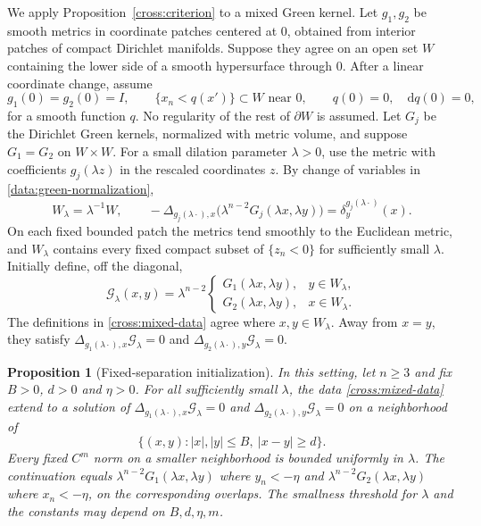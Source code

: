 \documentclass[11pt,a4paper]{article}
\newtheorem{proposition}[theorem]{Proposition}
\theoremstyle{definition}
\theoremstyle{remark}
\newcommand{\dd}{\mathrm d}
\numberwithin{equation}{section}
\begin{document}
We apply Proposition~\ref{cross:criterion} to a mixed Green kernel.
Let $g_1,g_2$ be smooth
metrics in coordinate patches centered at $0$, obtained from interior
patches of compact Dirichlet manifolds.  Suppose they agree on an open
set $W$ containing the lower side of a smooth hypersurface through $0$.
After a linear coordinate change, assume
\[
 g_1(0)=g_2(0)=I,\qquad
 \{x_n<q(x')\}\subset W\text{ near }0,\qquad
 q(0)=0,\quad \dd q(0)=0,
\]
for a smooth function $q$.  No regularity of the rest of $\partial W$
is assumed.
Let $G_j$ be the Dirichlet Green kernels, normalized with metric volume,
and suppose $G_1=G_2$ on $W\times W$.
For a small dilation parameter $\lambda>0$, use the metric with
coefficients $g_j(\lambda z)$ in the rescaled coordinates $z$.
By change of variables in \eqref{data:green-normalization},
\begin{equation}\label{cross:dilation}
 W_\lambda=\lambda^{-1}W,\qquad
 -\Delta_{g_j(\lambda\cdot),x}
    \bigl(\lambda^{n-2}G_j(\lambda x,\lambda y)\bigr)
     =\delta_y^{g_j(\lambda\cdot)}(x).
\end{equation}
On each fixed bounded patch the metrics tend smoothly to the Euclidean
metric, and $W_\lambda$ contains every fixed compact subset of
$\{z_n<0\}$ for sufficiently small $\lambda$.
Initially define, off the diagonal,
\begin{equation}\label{cross:mixed-data}
 \mathcal G_\lambda(x,y)=\lambda^{n-2}
 \begin{cases}
 G_1(\lambda x,\lambda y),&y\in W_\lambda,\\
 G_2(\lambda x,\lambda y),&x\in W_\lambda.
 \end{cases}
\end{equation}
The definitions in \eqref{cross:mixed-data} agree where
$x,y\in W_\lambda$.  Away from $x=y$, they satisfy
$\Delta_{g_1(\lambda\cdot),x}\mathcal G_\lambda=0$ and
$\Delta_{g_2(\lambda\cdot),y}\mathcal G_\lambda=0$.

\begin{proposition}[Fixed-separation initialization]\label{cross:initial}
In this setting, let $n\ge3$ and fix $B>0$, $d>0$ and $\eta>0$.
For all sufficiently small $\lambda$, the data
\eqref{cross:mixed-data} extend to a solution of
$\Delta_{g_1(\lambda\cdot),x}\mathcal G_\lambda=0$ and
$\Delta_{g_2(\lambda\cdot),y}\mathcal G_\lambda=0$ on a
neighborhood of
\[
 \{(x,y):|x|,|y|\le B,\ |x-y|\ge d\}.
\]
Every fixed $C^m$ norm on a smaller neighborhood is bounded uniformly
in $\lambda$. The continuation equals $\lambda^{n-2}G_1(\lambda x,\lambda y)$
where $y_n<-\eta$ and $\lambda^{n-2}G_2(\lambda x,\lambda y)$ where
$x_n<-\eta$, on the corresponding overlaps. The smallness threshold
for $\lambda$ and the constants may depend on $B,d,\eta,m$.
\end{proposition}
\end{document}
